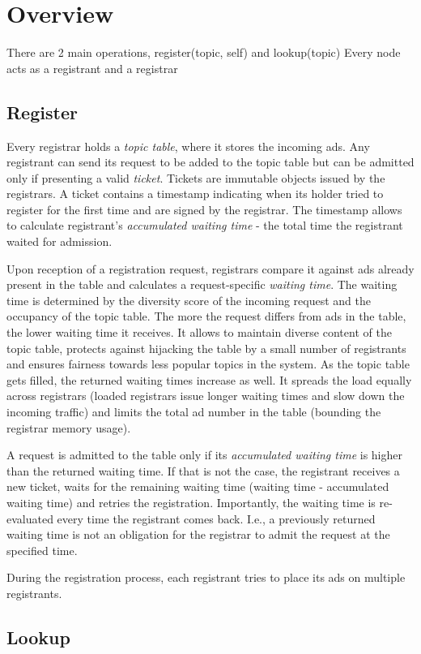 \section{Overview}

There are 2 main operations, register(topic, self) and lookup(topic)
Every node acts as a registrant and a registrar

\subsection{Register}
Every registrar holds a \emph{topic table}, where it stores the incoming ads. Any registrant can send its request to be added to the topic table but can be admitted only if presenting a valid \emph{ticket}. Tickets are immutable objects issued by the registrars. A ticket contains a timestamp indicating when its holder tried to register for the first time and are signed by the registrar. The timestamp allows to calculate registrant's \emph{accumulated waiting time} - the total time the registrant waited for admission. 

Upon reception of a registration request, registrars compare it against ads already present in the table and calculates a request-specific \emph{waiting time}. The waiting time is determined by the diversity score of the incoming request and the occupancy of the topic table. The more the request differs from ads in the table, the lower waiting time it receives. It allows to maintain diverse content of the topic table, protects against hijacking the table by a small number of registrants and ensures fairness towards less popular topics in the system. As the topic table gets filled, the returned waiting times increase as well. It spreads the load equally across registrars (loaded registrars issue longer waiting times and slow down the incoming traffic) and limits the total ad number in the table (bounding the registrar memory usage). 

A request is admitted to the table only if its \emph{accumulated waiting time} is higher than the returned waiting time. If that is not the case, the registrant receives a new ticket, waits for the remaining waiting time (waiting time - accumulated waiting time) and retries the registration. Importantly, the waiting time is re-evaluated every time the registrant comes back. I.e., a previously returned waiting time is not an obligation for the registrar to admit the request at the specified time. 

During the registration process, each registrant tries to place its ads on multiple registrants. 

\subsection{Lookup}